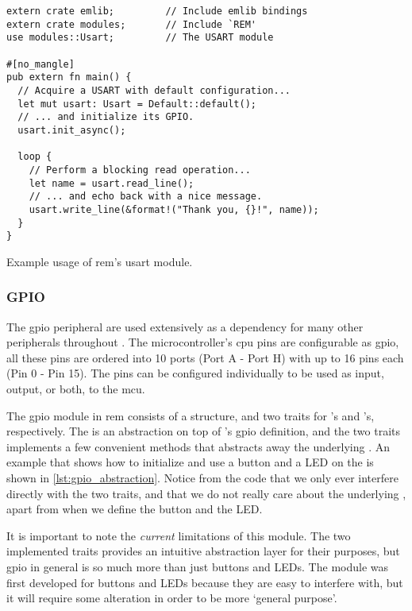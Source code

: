 \begin{listing}[H]
  \begin{verbatim}
extern crate emlib;         // Include emlib bindings
extern crate modules;       // Include `REM'
use modules::Usart;         // The USART module

#[no_mangle]
pub extern fn main() {
  // Acquire a USART with default configuration...
  let mut usart: Usart = Default::default();
  // ... and initialize its GPIO.
  usart.init_async();

  loop {
    // Perform a blocking read operation...
    let name = usart.read_line();
    // ... and echo back with a nice message.
    usart.write_line(&format!("Thank you, {}!", name));
  }
}
  \end{verbatim}
  \caption{Example usage of \gls{rem}'s \gls{usart} module.}
  \label{lst:usart_abstraction}
\end{listing}

\subsubsection{GPIO} %
\label{ssub:gpio}

The \gls{gpio} peripheral are used extensively as a dependency for many other peripherals throughout {\emlib}.
The microcontroller's \gls{cpu} pins are configurable as \gls{gpio}, all these pins are ordered into 10 ports (Port A - Port H) with up to 16 pins each (Pin 0 - Pin 15).
The pins can be configured individually to be used as input, output, or both, to the \gls{mcu}.

The \gls{gpio} module in \gls{rem} consists of a  structure, and two traits for 's and 's, respectively.
The  is an abstraction on top of {\emlib}'s \gls{gpio} definition, and the two traits implements a few convenient methods that abstracts away the underlying .
An example that shows how to initialize and use a button and a LED on the {\STK} is shown in \autoref{lst:gpio_abstraction}.
Notice from the code that we only ever interfere directly with the two traits, and that we do not really care about the underlying , apart from when we define the button and the LED.

It is important to note the \emph{current} limitations of this module.
The two implemented traits provides an intuitive abstraction layer for their purposes, but \gls{gpio} in general is so much more than just buttons and LEDs.
The module was first developed for buttons and LEDs because they are easy to interfere with, but it will require some alteration in order to be more `general purpose'.

